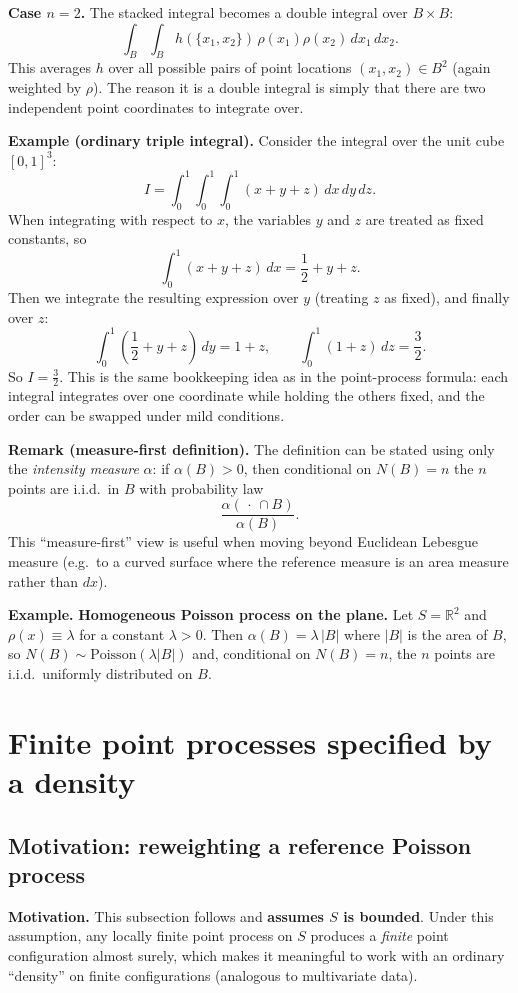 \noindent\textbf{Case $n=2$.} The stacked integral becomes a double integral over $B\times B$:
$$
\int_B\int_B h(\{x_1,x_2\})\,\rho(x_1)\rho(x_2)\,dx_1\,dx_2.
$$
This averages $h$ over all possible pairs of point locations $(x_1,x_2)\in B^2$ (again weighted by $\rho$).
The reason it is a double integral is simply that there are two independent point coordinates to integrate over.

\noindent\textbf{Example (ordinary triple integral).}
Consider the integral over the unit cube $[0,1]^3$:
$$
I=\int_0^1\int_0^1\int_0^1 (x+y+z)\,dx\,dy\,dz.
$$
When integrating with respect to $x$, the variables $y$ and $z$ are treated as fixed constants, so
$$
\int_0^1 (x+y+z)\,dx=\frac{1}{2}+y+z.
$$
Then we integrate the resulting expression over $y$ (treating $z$ as fixed), and finally over $z$:
$$
\int_0^1\left(\frac{1}{2}+y+z\right)\,dy = 1+z,
\qquad
\int_0^1 (1+z)\,dz=\frac{3}{2}.
$$
So $I=\frac{3}{2}$. This is the same bookkeeping idea as in the point-process formula: each integral integrates over one
coordinate while holding the others fixed, and the order can be swapped under mild conditions.

\noindent\textbf{Remark (measure-first definition).}
The definition can be stated using only the \emph{intensity measure} $\alpha$:
if $\alpha(B)>0$, then conditional on $N(B)=n$ the $n$ points are i.i.d.\ in $B$ with probability law
$$
\frac{\alpha(\,\cdot\,\cap B)}{\alpha(B)}.
$$
This ``measure-first'' view is useful when moving beyond Euclidean Lebesgue measure (e.g.\ to a curved surface where the
reference measure is an area measure rather than $dx$).

\noindent\textbf{Example.}
\textbf{Homogeneous Poisson process on the plane.} Let $S=\mathbb{R}^2$ and $\rho(x)\equiv\lambda$ for a constant
$\lambda>0$. Then $\alpha(B)=\lambda\,|B|$ where $|B|$ is the area of $B$, so $N(B)\sim\mathrm{Poisson}(\lambda|B|)$ and,
conditional on $N(B)=n$, the $n$ points are i.i.d.\ uniformly distributed on $B$.

\section{Finite point processes specified by a density}
\subsection{Motivation: reweighting a reference Poisson process}

\noindent\textbf{Motivation.}
This subsection follows \cite{coeurjolly2017palm} and \textbf{assumes $S$ is bounded}. Under this assumption, any locally
finite point process on $S$ produces a \emph{finite} point configuration almost surely, which makes it meaningful to work
with an ordinary ``density'' on finite configurations (analogous to multivariate data).

